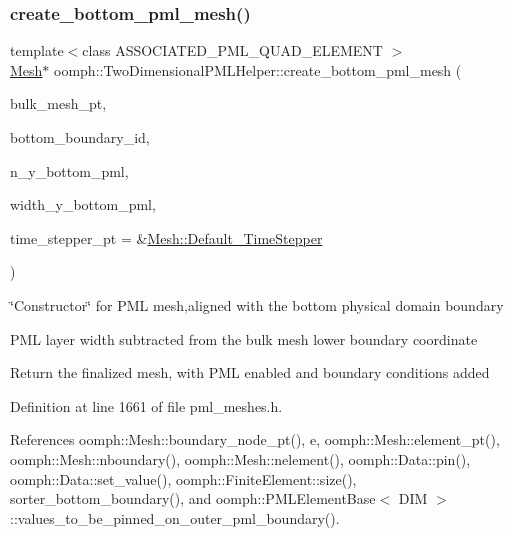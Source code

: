 \subsubsection{\texorpdfstring{create\+\_\+bottom\+\_\+pml\+\_\+mesh()}{create\_bottom\_pml\_mesh()}}
{\footnotesize\ttfamily template$<$class A\+S\+S\+O\+C\+I\+A\+T\+E\+D\+\_\+\+P\+M\+L\+\_\+\+Q\+U\+A\+D\+\_\+\+E\+L\+E\+M\+E\+NT $>$ \\
\hyperlink{classoomph_1_1Mesh}{Mesh}$\ast$ oomph\+::\+Two\+Dimensional\+P\+M\+L\+Helper\+::create\+\_\+bottom\+\_\+pml\+\_\+mesh (\begin{DoxyParamCaption}\item[{\hyperlink{classoomph_1_1Mesh}{Mesh} $\ast$}]{bulk\+\_\+mesh\+\_\+pt,  }\item[{const unsigned \&}]{bottom\+\_\+boundary\+\_\+id,  }\item[{const unsigned \&}]{n\+\_\+y\+\_\+bottom\+\_\+pml,  }\item[{const double \&}]{width\+\_\+y\+\_\+bottom\+\_\+pml,  }\item[{\hyperlink{classoomph_1_1TimeStepper}{Time\+Stepper} $\ast$}]{time\+\_\+stepper\+\_\+pt = {\ttfamily \&\hyperlink{classoomph_1_1Mesh_a12243d0fee2b1fcee729ee5a4777ea10}{Mesh\+::\+Default\+\_\+\+Time\+Stepper}} }\end{DoxyParamCaption})}



\char`\"{}\+Constructor\char`\"{} for P\+ML mesh,aligned with the bottom physical domain boundary 

P\+ML layer width subtracted from the bulk mesh lower boundary coordinate

Return the finalized mesh, with P\+ML enabled and boundary conditions added 

Definition at line 1661 of file pml\+\_\+meshes.\+h.



References oomph\+::\+Mesh\+::boundary\+\_\+node\+\_\+pt(), e, oomph\+::\+Mesh\+::element\+\_\+pt(), oomph\+::\+Mesh\+::nboundary(), oomph\+::\+Mesh\+::nelement(), oomph\+::\+Data\+::pin(), oomph\+::\+Data\+::set\+\_\+value(), oomph\+::\+Finite\+Element\+::size(), sorter\+\_\+bottom\+\_\+boundary(), and oomph\+::\+P\+M\+L\+Element\+Base$<$ D\+I\+M $>$\+::values\+\_\+to\+\_\+be\+\_\+pinned\+\_\+on\+\_\+outer\+\_\+pml\+\_\+boundary().

\mbox{\label{namespaceoomph_1_1TwoDimensionalPMLHelper_a24327201a96ccb79e34caad6a577672a}} 
